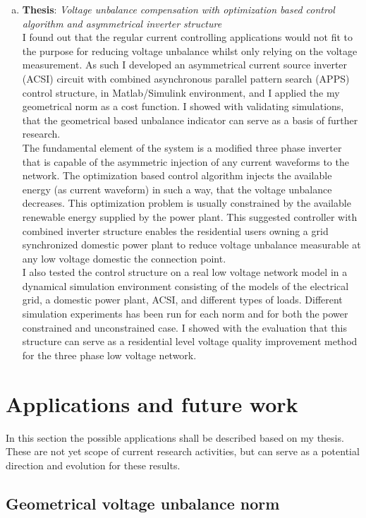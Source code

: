 \begin{enumerate}[a.)]
\item\textbf{Thesis}: \emph{Voltage unbalance compensation with optimization based control algorithm and asymmetrical inverter structure}\\
     I found out that the regular current controlling applications would not fit to the purpose for reducing voltage unbalance whilst only relying on the voltage measurement. As such I developed an asymmetrical current source inverter (ACSI) circuit with combined asynchronous parallel pattern search (APPS) control structure, in Matlab/Simulink environment, and I applied the my geometrical norm as a cost function. I showed with validating simulations, that the geometrical based unbalance indicator can serve as a basis of further research. \\
		The fundamental element of the system is a modified three phase inverter that is capable of the asymmetric injection of any current waveforms to the network. The optimization based control algorithm injects the available energy (as current waveform) in such a way, that the voltage unbalance decreases. This optimization problem is usually constrained by the available renewable energy supplied by the power plant. This suggested controller with combined inverter structure enables the residential users owning a grid synchronized domestic power plant to reduce voltage unbalance measurable at any low voltage domestic the connection point. \\
    I also tested the control structure on a real low voltage network model in a dynamical simulation environment consisting of the models of the electrical grid, a domestic power plant, ACSI, and different types of loads. Different simulation experiments has been run for each norm and for both the power constrained and unconstrained case. I showed with the evaluation that this structure can serve as a residential level voltage quality improvement method for the three phase low voltage network.\\
\end{enumerate}
		\section{Applications and future work}
		
		In this section the possible applications shall be described based on my thesis. These are not yet scope of current research activities, but can serve as a potential direction and evolution for these results.
		
		\subsection{Geometrical voltage unbalance norm}
		

